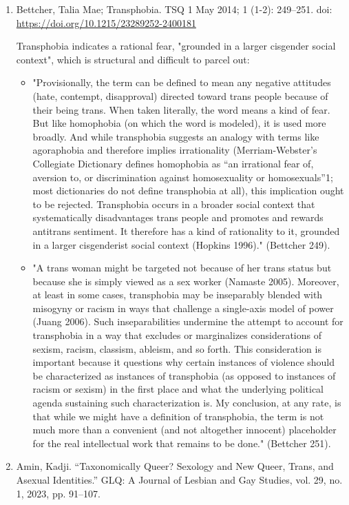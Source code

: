 \documentclass[11pt]{article}
\begin{document}
\begin{enumerate}
\item Bettcher, Talia Mae; Transphobia. TSQ 1 May 2014; 1 (1-2): 249–251. doi: \url{https://doi.org/10.1215/23289252-2400181}
\label{sec:org10189f4}

Transphobia indicates a rational fear, "grounded in a larger cisgender
social context", which is structural and difficult to parcel out:
\begin{itemize}
\item "Provisionally, the term can be defined to mean any negative
attitudes (hate, contempt, disapproval) directed toward trans people
because of their being trans. When taken literally, the word means a
kind of fear. But like homophobia (on which the word is modeled), it
is used more broadly. And while transphobia suggests an analogy with
terms like agoraphobia and therefore implies irrationality
(Merriam-Webster's Collegiate Dictionary defines homophobia as “an
irrational fear of, aversion to, or discrimination against
homosexuality or homosexuals”1; most dictionaries do not define
transphobia at all), this implication ought to be rejected.
Transphobia occurs in a broader social context that systematically
disadvantages trans people and promotes and rewards antitrans
sentiment. It therefore has a kind of rationality to it, grounded in
a larger cisgenderist social context (Hopkins 1996)." (Bettcher
249).
\item "A trans woman might be targeted not because of her trans status
but because she is simply viewed as a sex worker (Namaste 2005).
Moreover, at least in some cases, transphobia may be inseparably
blended with misogyny or racism in ways that challenge a single-axis
model of power (Juang 2006). Such inseparabilities undermine the
attempt to account for transphobia in a way that excludes or
marginalizes considerations of sexism, racism, classism, ableism,
and so forth. This consideration is important because it questions
why certain instances of violence should be characterized as
instances of transphobia (as opposed to instances of racism or
sexism) in the first place and what the underlying political agenda
sustaining such characterization is. My conclusion, at any rate, is
that while we might have a definition of transphobia, the term is
not much more than a convenient (and not altogether innocent)
placeholder for the real intellectual work that remains to be done."
(Bettcher 251).
\end{itemize}

\item Amin, Kadji. “Taxonomically Queer? Sexology and New Queer, Trans, and Asexual Identities.” GLQ: A Journal of Lesbian and Gay Studies, vol. 29, no. 1, 2023, pp. 91–107.
\label{sec:orga6e11bc}


\end{enumerate}
\end{document}
